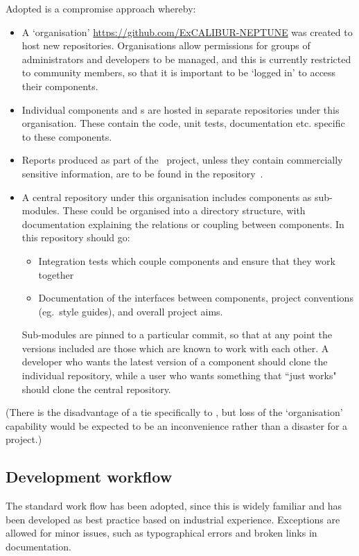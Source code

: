 Adopted is a compromise approach whereby:
\begin{itemize}
\item A  `organisation' \url{https://github.com/ExCALIBUR-NEPTUNE}
was created to host new repositories. 
Organisations allow permissions for groups of administrators and
developers to be managed, and this is currently restricted to community members, so
that it is important to be `logged in' to access their components.
\item Individual components and \papp s are hosted in separate repositories under this
organisation. These contain the code, unit tests, documentation etc.
specific to these components.
\item Reports produced as part of the \nep \ project, unless they
contain commercially sensitive information, are to be found in the
repository~\cite{xpndocswebsite}.
\item A central repository under this 
organisation includes components as sub-modules. These could be
organised into a directory structure, with documentation explaining the relations
or coupling between components. In this repository should go:
\begin{itemize}
\item Integration tests which couple components and ensure that they work together
\item Documentation of the interfaces between components, project conventions
(eg.\ style guides), and overall project aims.
\end{itemize}
Sub-modules are pinned to a particular  commit, so that at any
point the versions included are those which are known to work with
each other. A developer who wants the latest version of a component
should clone the individual repository, while a user who wants
something that ``just works" should clone the central repository.
\end{itemize}
(There is the disadvantage of a tie specifically to , but loss
of the `organisation' capability would be expected to be an inconvenience rather
than a disaster for a project.)

\subsection{Development workflow} \label{sec:develop}

The standard  work flow has been adopted, since this is widely
familiar and has been developed as best practice based on industrial
experience. Exceptions are allowed for minor issues, such as typographical
errors and broken links in documentation.

